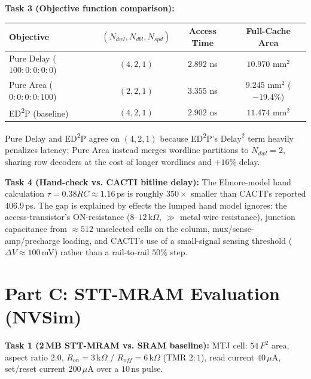 \documentclass[11pt]{article}
\begin{document}
\textbf{Task 3 (Objective function comparison):}
\begin{center}
\begin{tabular}{lccc}
\toprule
Objective & $(N_{dwl},N_{dbl},N_{spd})$ & Access Time & Full-Cache Area \\
\midrule
Pure Delay ($100{:}0{:}0{:}0{:}0$) & $(4,2,1)$ & $2.892$ ns & $10.970$ mm$^2$ \\
Pure Area ($0{:}0{:}0{:}0{:}100$) & $(2,2,1)$ & $3.355$ ns & $\mathbf{9.245}$ mm$^2$ ($-19.4\%$) \\
ED\textsuperscript{2}P (baseline) & $(4,2,1)$ & $2.902$ ns & $11.474$ mm$^2$ \\
\bottomrule
\end{tabular}
\end{center}
Pure Delay and ED\textsuperscript{2}P agree on $(4,2,1)$ because ED\textsuperscript{2}P's $\text{Delay}^2$ term heavily penalizes latency; Pure Area instead merges wordline partitions to $N_{dwl}=2$, sharing row decoders at the cost of longer wordlines and $+16\%$ delay.

\textbf{Task 4 (Hand-check vs. CACTI bitline delay):} The Elmore-model hand calculation $\tau=0.38RC\approx1.16$\,ps is roughly $350\times$ smaller than CACTI's reported $406.9$\,ps. The gap is explained by effects the lumped hand model ignores: the access-transistor's ON-resistance ($8$--$12$\,k$\Omega$, $\gg$ metal wire resistance), junction capacitance from $\approx512$ unselected cells on the column, mux/sense-amp/precharge loading, and CACTI's use of a small-signal sensing threshold ($\Delta V\approx100$\,mV) rather than a rail-to-rail $50\%$ step.

\section{Part C: STT-MRAM Evaluation (NVSim)}

\textbf{Task 1 (2\,MB STT-MRAM vs. SRAM baseline):} MTJ cell: $54\,F^2$ area, aspect ratio $2.0$, $R_{on}=3$\,k$\Omega$ / $R_{off}=6$\,k$\Omega$ (TMR $2{:}1$), read current $40\,\mu$A, set/reset current $200\,\mu$A over a $10$\,ns pulse.
\end{document}
